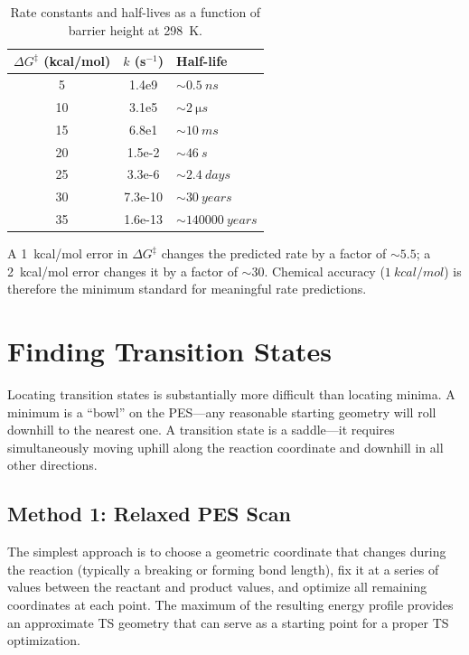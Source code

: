 \documentclass[11pt]{article}
\numberwithin{equation}{section}
\begin{document}
\begin{table}[h]
\centering
\caption{Rate constants and half-lives as a function of barrier height at \SI{298}{K}.}
\label{tab:barriers}
\begin{tabular}{S[table-format=2.0]S[table-format=1.1e2]l}
\toprule
{$\Delta G^\ddagger$ (kcal/mol)} & {$k$ (s$^{-1}$)} & {Half-life} \\
 & 1.4e9 & ${\sim}\SI{0.5}{ns}$ \\
10 & 3.1e5 & ${\sim}\SI{2}{\micro s}$ \\
15 & 6.8e1 & ${\sim}\SI{10}{ms}$ \\
20 & 1.5e-2 & ${\sim}\SI{46}{s}$ \\
25 & 3.3e-6 & ${\sim}\SI{2.4}{days}$ \\
30 & 7.3e-10 & ${\sim}\SI{30}{years}$ \\
35 & 1.6e-13 & ${\sim}\SI{140000}{years}$ \\
\bottomrule
\end{tabular}
\end{table}

A \SI{1}{kcal/mol} error in $\Delta G^\ddagger$ changes the predicted rate by a factor of ${\sim}5.5$; a \SI{2}{kcal/mol} error changes it by a factor of ${\sim}30$. Chemical accuracy ($\SI{1}{kcal/mol}$) is therefore the minimum standard for meaningful rate predictions.


\section{Finding Transition States}
\label{sec:finding_TS}

Locating transition states is substantially more difficult than locating minima. A minimum is a ``bowl'' on the PES---any reasonable starting geometry will roll downhill to the nearest one. A transition state is a saddle---it requires simultaneously moving uphill along the reaction coordinate and downhill in all other directions.

\subsection{Method 1: Relaxed PES Scan}

The simplest approach is to choose a geometric coordinate that changes during the reaction (typically a breaking or forming bond length), fix it at a series of values between the reactant and product values, and optimize all remaining coordinates at each point. The maximum of the resulting energy profile provides an approximate TS geometry that can serve as a starting point for a proper TS optimization.
\end{document}

